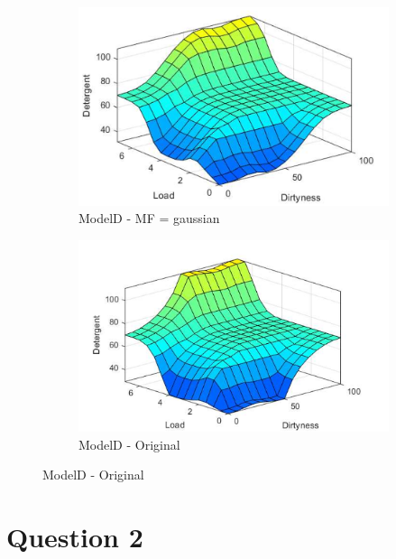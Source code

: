 \documentclass[11pt]{article}
\begin{document}
\begin{enumerate}[label=(\alph*)]
  \begin{figure}[ht!]
  \centering
  \begin{subfigure}{.5\textwidth}
    \centering
    \includegraphics[width=.9\linewidth]{res/modelD_gaussian}
    \caption{ModelD - MF = gaussian}
    \label{fig:sub1}
  \end{subfigure}%
  \begin{subfigure}{.5\textwidth}
    \centering
    \includegraphics[width=.9\linewidth]{res/image2}
    \caption{ModelD - Original}
    \label{fig:sub2}
  \end{subfigure}
  \end{figure}

\end{enumerate}



\pagebreak

\section*{Question 2}
\end{document}
